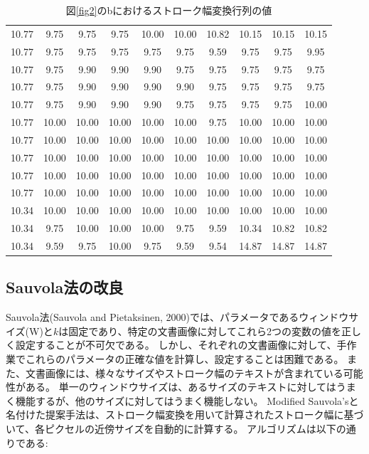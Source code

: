 \documentclass[uplatex, twocolumn,10pt]{jsarticle}
\begin{document}
\begin{table}[tp]
    \centering
    \caption{図\ref{fig2}のbにおけるストローク幅変換行列の値}
    \label{table2}
    \begin{tabular}{cccccccccc}
        \hline
        10.77 & 9.75  & 9.75  & 9.75  & 10.00 & 10.00 & 10.82 & 10.15 & 10.15 & 10.15 \\
        10.77 & 9.75  & 9.75  & 9.75  & 9.75  & 9.75  & 9.59  & 9.75  & 9.75  & 9.95  \\
        10.77 & 9.75  & 9.90  & 9.90  & 9.90  & 9.75  & 9.75  & 9.75  & 9.75  & 9.75  \\ 
        10.77 & 9.75  & 9.90  & 9.90  & 9.90  & 9.90  & 9.75  & 9.75  & 9.75  & 9.75  \\
        10.77 & 9.75  & 9.90  & 9.90  & 9.90  & 9.75  & 9.75  & 9.75  & 9.75  & 10.00 \\
        10.77 & 10.00 & 10.00 & 10.00 & 10.00 & 10.00 & 9.75  & 10.00 & 10.00 & 10.00 \\
        10.77 & 10.00 & 10.00 & 10.00 & 10.00 & 10.00 & 10.00 & 10.00 & 10.00 & 10.00 \\
        10.77 & 10.00 & 10.00 & 10.00 & 10.00 & 10.00 & 10.00 & 10.00 & 10.00 & 10.00 \\
        10.77 & 10.00 & 10.00 & 10.00 & 10.00 & 10.00 & 10.00 & 10.00 & 10.00 & 10.00 \\
        10.77 & 10.00 & 10.00 & 10.00 & 10.00 & 10.00 & 10.00 & 10.00 & 10.00 & 10.00 \\
        10.34 & 10.00 & 10.00 & 10.00 & 10.00 & 10.00 & 10.00 & 10.00 & 10.00 & 10.00 \\
        10.34 & 9.75  & 10.00 & 10.00 & 10.00 & 9.75  & 9.59  & 10.34 & 10.82 & 10.82 \\
        10.34 & 9.59  & 9.75  & 10.00 & 9.75  & 9.59  & 9.54  & 14.87 & 14.87 & 14.87 \\
        \hline
    \end{tabular}
\end{table}


\subsection{Sauvola法の改良}

Sauvola法(Sauvola and Pietaksinen, 2000)では、パラメータであるウィンドウサイズ(W)と$k$は固定であり、特定の文書画像に対してこれら2つの変数の値を正しく設定することが不可欠である。
しかし、それぞれの文書画像に対して、手作業でこれらのパラメータの正確な値を計算し、設定することは困難である。
また、文書画像には、様々なサイズやストローク幅のテキストが含まれている可能性がある。
単一のウィンドウサイズは、あるサイズのテキストに対してはうまく機能するが、他のサイズに対してはうまく機能しない。
Modified Sauvola'sと名付けた提案手法は、ストローク幅変換を用いて計算されたストローク幅に基づいて、各ピクセルの近傍サイズを自動的に計算する。
アルゴリズムは以下の通りである:
\end{document}
